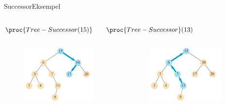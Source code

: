 \documentclass[aspectratio=1610]{beamer}
\begin{document}
\begin{frame}{Successor}{Eksempel}
    \begin{columns}
        \centering

        $\proc{Tree-Successor(15)}$
    
        \centering

        $\proc{Tree-Successor}(13)$

    \end{columns}

    \begin{columns}
        \begin{figure}[h]
            \centering
            \includegraphics[width=0.9\textwidth]{bst/tree-successor-15}
        \end{figure}
    
        \begin{figure}[h]
            \centering
            \includegraphics[width=0.9\textwidth]{bst/tree-successor-13}
        \end{figure}


\end{columns}
\end{frame}
\end{document}
